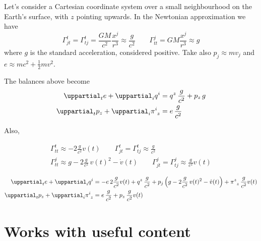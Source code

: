 \documentclass[\ifafour a4paper,12pt,\else a5paper,10pt,\fi%
onecolumn,oneside,article,%
british%
]{memoir}
\theoremstyle{remark}
\theoremstyle{innote}
\newcommand*{\de}{\uppartial}%
\renewcommand*{\|}[1][]{\nonscript\:#1\vert\nonscript\:\mathopen{}}
\newcommand*{\sect}{\S}%
\renewcommand*{\i}{{}\indices}
\begin{document}
Let's consider a Cartesian coordinate system over a small neighbourhood on the Earth's surface, with $z$ pointing upwards. In the Newtonian approximation we have \autocites[\sect\,5.2.3]{poissonetal2014}
\begin{equation}
  \label{eq:christof_newt}
  \varGamma^{t}_{jt}=\varGamma^{t}_{tj} =
    \frac{GM}{c^{2}}\frac{x^{j}}{r^{3}} \approx \frac{g}{c^{2}}
  \qquad\varGamma^{j}_{tt} = GM\frac{x^{j}}{r^{3}} \approx g
\end{equation}
where $g$ is the standard acceleration, considered positive. Take also $p_{j} \approx m v_{j}$ and $e\approx m c^{2} + \frac{1}{2}mv^{2}$.



The balances above become
\begin{align}
  \label{eq:div_e_appr}
  \de_{t}e + \de_{i}q^{i} &=
  q^{z}\, \frac{g}{c^{2}}
  +p_{z}\, g
  \\
  \label{eq:div_p_appr}
  \de_{t}p_{z} +  \de_{i}\pi\i{^{i}_{z}} &=
  e\,\frac{g}{c^{2}}
\end{align}

Also,

\begin{equation}
  \label{eq:christof_body}
  \begin{gathered}
    \varGamma^{t}_{tt} \approx
    -2\frac{g}{c^{2}} v(t)
    \qquad
    \varGamma^{t}_{jt}=\varGamma^{t}_{tj}
    \approx \frac{g}{c^{2}}
    \\
    \varGamma^{j}_{tt} \approx
    g - 2\frac{g}{c^{2}}\,v(t)^{2} - \dot{v}(t)
    \qquad
    \varGamma^{j}_{jt} = \varGamma^{j}_{tj} \approx
    \frac{g}{c^{2}} v(t)
  \end{gathered}
\end{equation}

\begin{align}
  \label{eq:div_e_Newt}
  \de_{t}e + \de_{i}q^{i} &=
  -e\,2\frac{g}{c^{2}} v(t)
  +q^{z}\, \frac{g}{c^{2}}
  +p_{j}\, \Bigl(g - 2\frac{g}{c^{2}}\,v(t)^{2} - \dot{v}(t)\Bigr)
  +\pi\i{^{z}_{z}}\, \frac{g}{c^{2}} v(t)
  \\
  \label{eq:div_p_Newt}
  \de_{t}p_{z} +  \de_{i}\pi\i{^{i}_{z}} &=
  e\, \frac{g}{c^{2}}
  +p_{z}\,\frac{g}{c^{2}} v(t)
\end{align}


\section{Works with useful content}
\label{sec:works}
\end{document}
